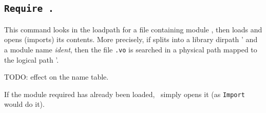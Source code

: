 







\subsection[\tt Require {\dirpath}.]{\tt Require {\dirpath}.\label{Require}
}

This command looks in the loadpath for a file containing module
{\dirpath}, then loads and opens (imports) its contents.
More precisely, if {\dirpath} splits into a library dirpath {\dirpath'} and a module name {\textsl{ident}}, then the file {\ident}{\tt .vo} is searched in a physical path mapped to the logical path {\dirpath'}.

TODO: effect on the name table.

If the module required has already been loaded, \Coq\ 
simply opens it (as {\tt Import {\dirpath}} would do it).

